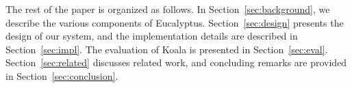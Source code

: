 The rest of the paper is organized as follows.  In Section~\ref{sec:background}, we describe the various components of Eucalyptus.  Section~\ref{sec:design} presents the design of our system, and the implementation details are described in Section~\ref{sec:impl}.  The evaluation of Koala is presented in Section~\ref{sec:eval}.  Section~\ref{sec:related} discusses related work, and concluding remarks are provided in Section~\ref{sec:conclusion}.%




